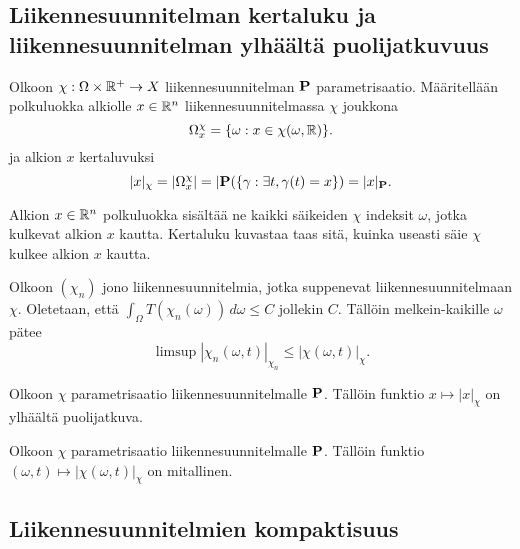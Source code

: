 \subsection{Liikennesuunnitelman kertaluku ja liikennesuunnitelman ylhäältä puolijatkuvuus}

\begin{definition}
Olkoon $\chi : \Omega \times \R^+ \to X$ liikennesuunnitelman $\P$ parametrisaatio. Määritellään polkuluokka alkiolle $x\in \R^n$ liikennesuunnitelmassa $\chi$ joukkona
\begin{equation*}
    \Omega_x^\chi = \{\omega : x \in \chi(\omega, \R)\}.
\end{equation*}
ja alkion $x$ kertaluvuksi
    \begin{equation*}
        |x|_\chi = |\Omega_x^\chi| = |\P(\{\gamma : \exists t, \gamma(t) = x\}) = |x|_\P.
    \end{equation*}
\end{definition}

Alkion $x\in \R^n$ polkuluokka sisältää ne kaikki säikeiden $\chi$ indeksit $\omega$, jotka kulkevat alkion $x$ kautta. Kertaluku kuvastaa taas sitä, kuinka useasti säie $\chi$ kulkee alkion $x$ kautta.

\begin{theorem}
    Olkoon $(\chi_n)$ jono liikennesuunnitelmia, jotka suppenevat liikennesuunnitelmaan $\chi$. Oletetaan, että $\int_\Omega T(\chi_n(\omega))\, d\omega \le C$ jollekin $C$. Tällöin melkein-kaikille $\omega$ pätee
    \begin{equation*}
        \limsup |\chi_n(\omega, t)|_{\chi_n} \le |\chi(\omega, t)|_\chi.
    \end{equation*}
\end{theorem}
\begin{lemma}
    Olkoon $\chi$ parametrisaatio liikennesuunnitelmalle $\P$. Tällöin funktio $x \mapsto |x|_\chi$ on ylhäältä puolijatkuva.
\end{lemma}

\begin{corollary}
    Olkoon $\chi$ parametrisaatio liikennesuunnitelmalle $\P$. Tällöin funktio $(\omega, t) \mapsto |\chi(\omega, t)|_\chi$ on mitallinen.
\end{corollary}

\subsection{Liikennesuunnitelmien  kompaktisuus}


